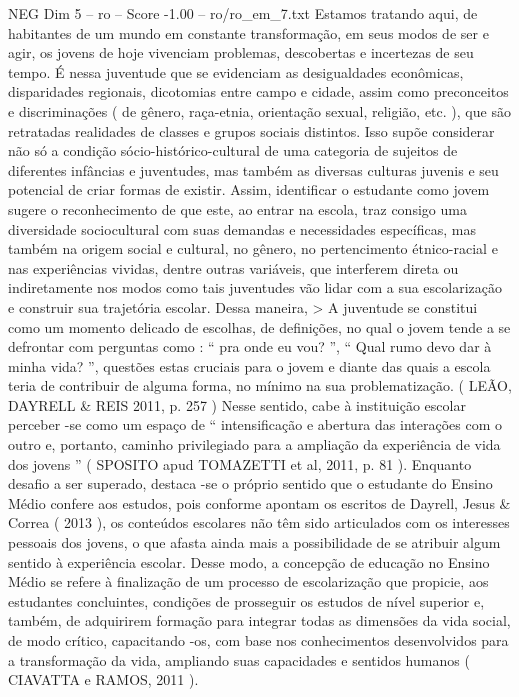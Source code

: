 \begin{textsample}{NEG Dim 5 – ro – Score -1.00 – ro/ro\_em\_7.txt}
Estamos tratando aqui, de habitantes de um mundo em constante transformação, em seus modos de ser e agir, os jovens de hoje vivenciam problemas, descobertas e incertezas de seu tempo.
É nessa juventude que se evidenciam as desigualdades econômicas, disparidades regionais, dicotomias entre campo e cidade, assim como preconceitos e discriminações ( de gênero, raça-etnia, orientação sexual, religião, etc. ), que são retratadas realidades de classes e grupos sociais distintos.
Isso supõe considerar não só a condição sócio-histórico-cultural de uma categoria de sujeitos de diferentes infâncias e juventudes, mas também as diversas culturas juvenis e seu potencial de criar formas de existir.
Assim, identificar o estudante como jovem sugere o reconhecimento de que este, ao entrar na escola, traz consigo uma diversidade sociocultural com suas demandas e necessidades específicas, mas também na origem social e cultural, no gênero, no pertencimento étnico-racial e nas experiências vividas, dentre outras variáveis, que interferem direta ou indiretamente nos modos como tais juventudes vão lidar com a sua escolarização e construir sua trajetória escolar.
Dessa maneira, > A juventude se constitui como um momento delicado de escolhas, de definições, no qual o jovem tende a se defrontar com perguntas como : “ pra onde eu vou? ”, “ Qual rumo devo dar à minha vida? ”, questões estas cruciais para o jovem e diante das quais a escola teria de contribuir de alguma forma, no mínimo na sua problematização. ( LEÃO, DAYRELL \& REIS 2011, p. 257 ) Nesse sentido, cabe à instituição escolar perceber -se como um espaço de “ intensificação e abertura das interações com o outro e, portanto, caminho privilegiado para a ampliação da experiência de vida dos jovens ” ( SPOSITO apud TOMAZETTI et al, 2011, p. 81 ).
Enquanto desafio a ser superado, destaca -se o próprio sentido que o estudante do Ensino Médio confere aos estudos, pois conforme apontam os escritos de Dayrell, Jesus \& Correa ( 2013 ), os conteúdos escolares não têm sido articulados com os interesses pessoais dos jovens, o que afasta ainda mais a possibilidade de se atribuir algum sentido à experiência escolar.
Desse modo, a concepção de educação no Ensino Médio se refere à finalização de um processo de escolarização que propicie, aos estudantes concluintes, condições de prosseguir os estudos de nível superior e, também, de adquirirem formação para integrar todas as dimensões da vida social, de modo crítico, capacitando -os, com base nos conhecimentos desenvolvidos para a transformação da vida, ampliando suas capacidades e sentidos humanos ( CIAVATTA e RAMOS, 2011 ).

\end{textsample}
